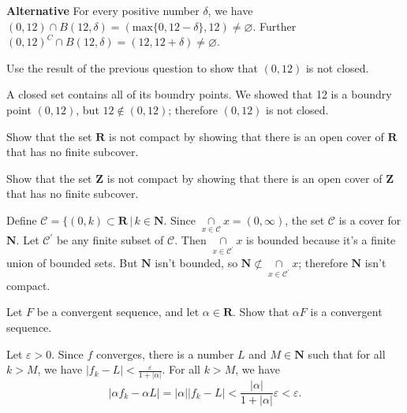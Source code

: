 \documentclass[12pt, fleqn]{exam}
\newcommand{\reals}{\mathbf{R}}
\begin{document}
\begin{questions}
\begin{solution}
\textbf{Alternative} For every positive number \(\delta\), we have
\( (0,12) \cap B(12, \delta)  = (\mbox{max} \{0, 12 - \delta \}, 12) \neq \varnothing\). 
Further \( (0,12)^C \cap B(12, \delta)  = (12, 12 + \delta) \neq \varnothing\). 

\end{solution}

\question  Use the result of the previous question to show that \((0,12)\) is not
closed.

\begin{solution}%
A closed set contains all of its boundry points. We showed that 12 is a boundry point \((0,12)\), but
\(12 \notin (0,12)\); therefore \((0,12)\) is not closed.
\end{solution}


\question  Show that the set \(\reals\) is not compact by 
showing that there is an open cover of \( \reals \) that has no
finite subcover.


\question  Show that the set \(\mathbf{Z}\) is not compact by 
showing that there is an open cover of \( \mathbf{Z} \) that has no
finite subcover.

\begin{solution}%
  Define \(\mathcal{C} = \{(0,k) \subset \reals \, | \, k \in \mathbf{N}\). Since 
  \(\underset{x \in \mathcal{C}}{\cap} x = (0,\infty)\), the set \(\mathcal{C}\)
is a cover for  \(\mathbf{N}\). Let  \(\mathcal{C}^\prime\) be any finite subset
of  \(\mathcal{C}\). Then \(\underset{x \in \mathcal{C}^\prime}{\cap} x\) is
bounded because it's a finite union of bounded sets.  But \(\mathbf{N}\) isn't
bounded, so \(\mathbf{N} \not \subset \underset{x \in \mathcal{C}^\prime}{\cap} x\);
therefore \(\mathbf{N}\) isn't compact.
\end{solution}


\question Let \(F\) be a convergent sequence, and let \(\alpha \in
\reals\).  Show that \(\alpha F\) is a convergent sequence.



\begin{solution}%
Let \(\varepsilon > 0\). Since \(f\) converges, there is a number \(L\) and 
\(M \in \mathbf{N}\) such that for all \(k > M\), we have \(|f_k - L| < \frac{\varepsilon}{1 + |\alpha|}\).
For all \(k > M\), we have
\[
  |\alpha f_k - \alpha L| = |\alpha| |f_k - L|
                          < \frac{ |\alpha|}{1 + |\alpha|} \varepsilon
                          < \varepsilon.
\]


\end{solution}
\end{questions}
\end{document}

